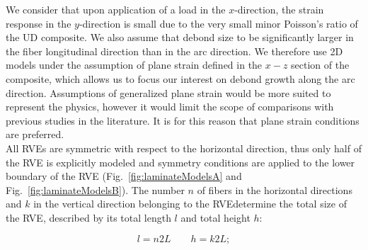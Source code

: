 \documentclass[smallextended]{svjour3}       %
\begin{document}
We consider that upon application of a load in the $x$-direction, the strain response in the $y$-direction is small due to the very small minor Poisson's ratio of the UD composite. We also assume that debond size to be significantly larger in the fiber longitudinal direction than in the arc direction. We therefore use 2D models under the assumption of plane strain defined in the $x-z$ section of the composite, which allows us to focus our interest on debond growth along the arc direction. Assumptions of generalized plane strain would be more suited to represent the physics, however it would limit the scope of comparisons with previous studies in the literature. It is for this reason that plane strain conditions are preferred.\\
All RVEs are symmetric with respect to the horizontal direction, thus only half of the RVE is explicitly modeled and symmetry conditions are applied to the lower boundary of the RVE (Fig.~\ref{fig:laminateModelsA} and Fig.~\ref{fig:laminateModelsB}). The number $n$ of fibers in the horizontal directions and $k$ in the vertical direction belonging to the RVEdetermine the total size of the RVE, described by its total length $l$ and total height $h$:

\begin{equation}\label{eq:lengthheight}
l=n2L\qquad h=k2L;
\end{equation}
\end{document}
